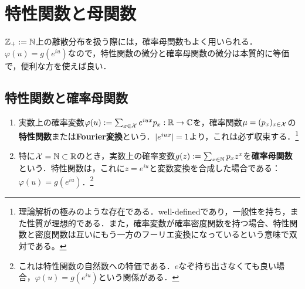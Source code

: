 \documentclass[uplatex,dvipdfmx]{jsreport}
\begin{document}
\section{特性関数と母関数}

\begin{tcolorbox}[colframe=ForestGreen, colback=ForestGreen!10!white,breakable,colbacktitle=ForestGreen!40!white,coltitle=black,fonttitle=\bfseries\sffamily,
title=]
    $\mathbb{Z}_+:=\mathbb{N}$上の離散分布を扱う際には，確率母関数もよく用いられる．
    $\varphi(u)=g(e^{iu})$なので，特性関数の微分と確率母関数の微分は本質的に等価で，便利な方を使えば良い．
\end{tcolorbox}

\subsection{特性関数と確率母関数}

\begin{definition}\mbox{}
    \begin{enumerate}
        \item 実数上の確率変数$\varphi(u):=\sum_{x\in\mathcal{X}}e^{iux}p_x:\mathbb{R}\to\mathbb{C}$を，確率関数$\mu=(p_x)_{x\in\mathcal{X}}$の\textbf{特性関数}または\textbf{Fourier変換}という．$\lvert e^{iux}\rvert=1$より，これは必ず収束する．\footnote{理論解析の極みのような存在である．well-definedであり，一般性を持ち，また性質が理想的である．また，確率変数が確率密度関数を持つ場合、特性関数と密度関数は互いにもう一方のフーリエ変換になっているという意味で双対である。}
        \item 特に$\mathcal{X}=\mathbb{N}\subset\mathbb{R}$のとき，実数上の確率変数$g(z):=\sum_{x\in\mathbb{N}}p_xz^x$を\textbf{確率母関数}という．特性関数は，これに$z=e^{iu}$と変数変換を合成した場合である：$\varphi(u)=g(e^{iu})$．\footnote{これは特性関数の自然数への特価である．$e$なぞ持ち出さなくても良い場合，$\varphi(u)=g(e^{iu})$という関係がある．}
    \end{enumerate}
\end{definition}
\end{document}
